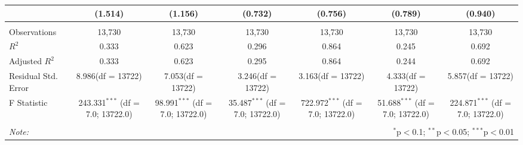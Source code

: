 \begin{table}[!htbp]
\begin{tabular}{@{\extracolsep{5pt}}lcccccc}
  & (1.514) & (1.156) & (0.732) & (0.756) & (0.789) & (0.940) \\
\hline \\[-1.8ex]
 Observations & 13,730 & 13,730 & 13,730 & 13,730 & 13,730 & 13,730 \\
 $R^2$ & 0.333 & 0.623 & 0.296 & 0.864 & 0.245 & 0.692 \\
 Adjusted $R^2$ & 0.333 & 0.623 & 0.295 & 0.864 & 0.244 & 0.692 \\
 Residual Std. Error & 8.986(df = 13722) & 7.053(df = 13722) & 3.246(df = 13722) & 3.163(df = 13722) & 4.333(df = 13722) & 5.857(df = 13722)  \\
 F Statistic & 243.331$^{***}$ (df = 7.0; 13722.0) & 98.991$^{***}$ (df = 7.0; 13722.0) & 35.487$^{***}$ (df = 7.0; 13722.0) & 722.972$^{***}$ (df = 7.0; 13722.0) & 51.688$^{***}$ (df = 7.0; 13722.0) & 224.871$^{***}$ (df = 7.0; 13722.0) \\
\hline
\hline \\[-1.8ex]
\textit{Note:} & \multicolumn{6}{r}{$^{*}$p$<$0.1; $^{**}$p$<$0.05; $^{***}$p$<$0.01} \\
\end{tabular}
\end{table}